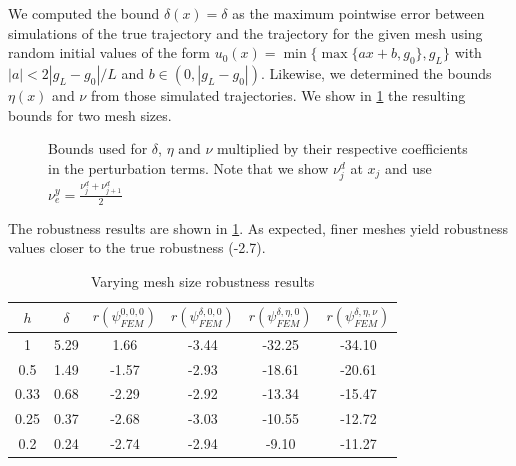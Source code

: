 \documentclass[letterpaper, 10 pt, conference]{ieeeconf/ieeeconf}
\begin{document}
We computed the bound $\delta(x) = \delta$ as the maximum pointwise
error between simulations of the true trajectory and the trajectory for the
given mesh using random initial values of the form $u_0(x) = \min\{\max\{a x +
b, g_0\}, g_L\}$ with $|a| < 2 |g_L - g_0| / L$ and $b \in (0, |g_L - g_0|)$.
Likewise, we determined the bounds $\eta(x)$ and $\nu$ from those simulated
trajectories. We show in \cref{fig:bounds} the resulting bounds for two mesh
sizes.

\begin{figure}[!t]
    \centering 
        \hfill
        \hfill
    \caption{Bounds used for $\delta$, $\eta$ and $\nu$ multiplied by their
    respective coefficients in the perturbation terms. Note that we show $\nu^d_j$ at
    $x_j$ and use $\nu_e^y = \frac{\nu^d_j + \nu^d_{j+1}}{2}$}
    \label{fig:bounds}
\end{figure}

The robustness results are shown in \cref{tab:res_meshes}. As expected, finer meshes
yield robustness values closer to the true robustness (-2.7).

\begin{table}
\centering
\caption{Varying mesh size robustness results}
\label{tab:res_meshes}
\begin{tabular}{|c|c|c|c|c|c|}
    \hline
    $h$ & $\delta$ & $r(\psi_{FEM}^{0, 0, 0})$ & $r(\psi_{FEM}^{\delta, 0, 0})$ &
    $r(\psi_{FEM}^{\delta, \eta, 0})$ & $r(\psi_{FEM}^{\delta, \eta,
\nu})$ \\
    \hline
    1 & 5.29 & 1.66 & -3.44 & -32.25 & -34.10 \\
    0.5 & 1.49 & -1.57 & -2.93 & -18.61 & -20.61 \\
    0.33 & 0.68 & -2.29 & -2.92 & -13.34 & -15.47 \\
    0.25 & 0.37 & -2.68 & -3.03 & -10.55 & -12.72 \\
    0.2 & 0.24 & -2.74 & -2.94 & -9.10 & -11.27 \\
    \hline
\end{tabular}
\end{table}
\end{document}
